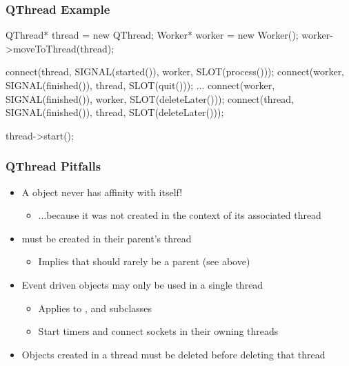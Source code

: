 
\begin{slide}[fragile]
\frametitle{QThread Example}

\begin{cpp}
QThread* thread = new QThread;
Worker* worker = new Worker();
worker->moveToThread(thread);

connect(thread, SIGNAL(started()),  worker, SLOT(process()));
connect(worker, SIGNAL(finished()), thread, SLOT(quit()));
...
connect(worker, SIGNAL(finished()), worker, SLOT(deleteLater()));
connect(thread, SIGNAL(finished()), thread, SLOT(deleteLater()));
        
thread->start();
\end{cpp}


\end{slide}


\begin{slide}
\frametitle{QThread Pitfalls}

\begin{itemize}
\item A  object never has affinity with itself!
  \begin{itemize}
  \item ...because it was not created in the context of its associated thread
  \end{itemize}
\item {} must be created in their parent's thread
  \begin{itemize}
  \item Implies that  should rarely be a parent (see above)
  \end{itemize}
\item Event driven objects may only be used in a single thread
  \begin{itemize}
  \item Applies to , and  subclasses
  \item Start timers and connect sockets in their owning threads
  \end{itemize}
\item Objects created in a thread must be deleted before deleting that thread
\end{itemize}

\end{slide}

